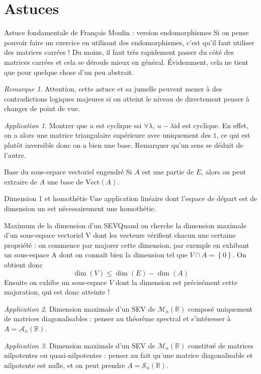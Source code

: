 \documentclass[french]{book}
\newcommand{\R}{\mathbb{R}}
\theoremstyle{plain}
\theoremstyle{definition}
\theoremstyle{remark}
\newtheorem*{rmq}{Remarque}
\newtheorem*{app}{Application}
\begin{document}
\section{Astuces}
\begin{AS}{Astuce fondamentale de François Moulin : version endomorphismes} Si on pense pouvoir faire un exercice en utilisant des endomorphismes, c'est qu'il faut utiliser des matrices carrées ! Du moins, il faut très rapidement passer du côté des matrices carrées et cela se déroule mieux en général. Évidemment, cela ne tient que pour quelque chose d'un peu abstrait.
\end{AS}
\begin{rmq}
	Attention, cette astuce et sa jumelle peuvent mener à des contradictions logiques majeures si on atteint le niveau de directement penser à changer de point de vue.
\end{rmq}
\begin{app}
	Montrer que $u$ est cyclique ssi $\forall \lambda,\ u-\lambda\text{id}$ est cyclique. En effet, on a alors une matrice triangulaire supérieure avec uniquement des $1$, ce qui est plutôt inversible donc on a bien une base. Remarquer qu'un sens se déduit de l'autre.
\end{app}
\begin{AS}{Base du sous-espace vectoriel engendré} Si $A$ est une partie de $E$, alors on peut extraire de $A$ une base de $\text{Vect}(A)$.
\end{AS}
\begin{AS}{Dimension 1 et homothétie} Une application linéaire dont l'espace de départ est de dimension un est nécessairement une homothétie.
\end{AS}
\begin{AS}{Maximum de la dimension d'un SEV}Quand on cherche la dimension maximale d’un sous-espace vectoriel V dont les vecteurs vérifient chacun une certaine propriété : on commence par majorer cette dimension, par exemple en exhibant un sous-espace A dont on connaît bien la dimension tel que $V\cap A=\left\{0\right\}$. On obtient donc $$\dim(V)\leqslant \dim(E)-\dim(A)$$ Ensuite on exhibe un sous-espace $V$ dont la dimension est précisément cette majoration, qui est donc atteinte !
\end{AS}
\begin{app}
	Dimension maximale d'un SEV de $\mathcal{M}_n(\R)$ composé uniquement de matrices diagonalisables : penser au théorème spectral et s'intéresser à $A=\mathcal{A}_n(\R)$.
\end{app}
\begin{app}
	Dimension maximale d'un SEV de $\mathcal{M}_n(\R)$ constitué de matrices nilpotentes ou quasi-nilpotentes : penser au fait qu'une matrice diagonalisable et nilpotente est nulle, et on peut prendre $A=\mathcal{S}_n(\R)$.
\end{app}
\end{document}
